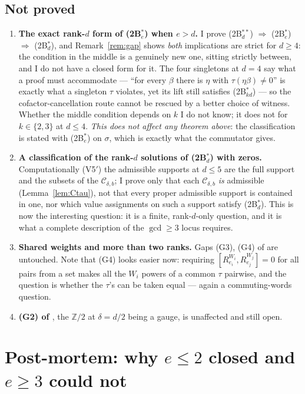 \documentclass[11pt]{article}
\theoremstyle{definition}
\theoremstyle{remark}
\newcommand{\Z}{\mathbb{Z}}
\newcommand{\Cset}{\mathcal{C}}
\begin{document}
\subsection*{Not proved}
\begin{enumerate}
\item[(H1)] \textbf{The exact rank-$d$ form of (2B$^*_e$) when $e>d$.}  I prove
  (2B$^{**}_d$) $\Rightarrow$ (2B$^{*}_e$) $\Rightarrow$ (2B$^{*}_d$), and
  Remark~\ref{rem:gap} shows \emph{both} implications are strict for $d\ge4$: the condition
  in the middle is a genuinely new one, sitting strictly between, and I do not have a closed
  form for it.  The four singletons at $d=4$ say what a proof must accommodate --- ``for
  every $\beta$ there is $\eta$ with $\tau(\eta\beta)\ne0$'' is exactly what a singleton
  $\tau$ violates, yet its lift still satisfies (2B$^{*}_{kd}$) --- so the
  cofactor-cancellation route cannot be rescued by a better choice of witness.  Whether the
  middle condition depends on $k$ I do not know; it does not for $k\in\{2,3\}$ at $d\le4$.
  \emph{This does not affect any theorem above}: the classification is stated with
  (2B$^*_e$) on $\sigma$, which is exactly what the commutator gives.
\item[(H2)] \textbf{A classification of the rank-$d$ solutions of (2B$^{*}_d$) with zeros.}
  Computationally (V5$'$) the admissible supports at $d\le5$ are the full support and the
  subsets of the $\Cset_{\delta,b}$; I prove only that each $\Cset_{\delta,b}$ \emph{is}
  admissible (Lemma~\ref{lem:Ctau}), not that every proper admissible support is contained in
  one, nor which value assignments on such a support satisfy (2B$^*_d$).  This is now the
  interesting question: it is a finite, rank-$d$-only question, and it is what a complete
  description of the $\gcd\ge3$ locus requires.
\item[(H3)] \textbf{Shared weights and more than two ranks.}  Gaps (G3), (G4) of
  \cite{Q149} are untouched.  Note that (G4) looks easier now: requiring
  $[R_{e_i}^{W_i},R_{e_j}^{W_j}]=0$ for all pairs from a set makes all the $W_i$ powers of a
  common $\tau$ pairwise, and the question is whether the $\tau$'s can be taken equal ---
  again a commuting-words question.
\item[(H4)] \textbf{(G2) of \cite{Q149}}, the $\Z/2$ at $\delta=d/2$ being a gauge, is
  unaffected and still open.
\end{enumerate}

\section{Post-mortem: why $e\le2$ closed and $e\ge3$ could not}\label{sec:postmortem}
\end{document}
